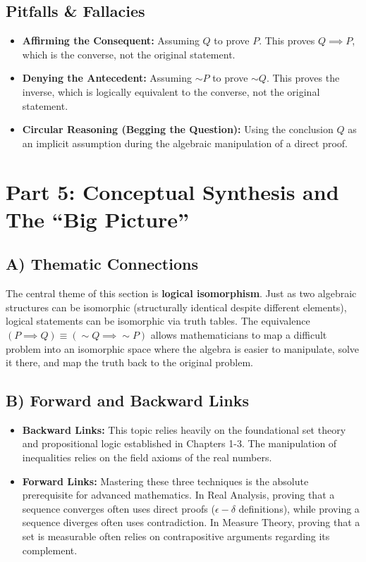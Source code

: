 \documentclass[11pt, a4paper]{article}
\theoremstyle{definition}
\theoremstyle{remark}
\begin{document}
\subsection{Pitfalls \& Fallacies}
\begin{itemize}
    \item \textbf{Affirming the Consequent:} Assuming $Q$ to prove $P$. This proves $Q \implies P$, which is the converse, not the original statement.
    \item \textbf{Denying the Antecedent:} Assuming $\sim P$ to prove $\sim Q$. This proves the inverse, which is logically equivalent to the converse, not the original statement.
    \item \textbf{Circular Reasoning (Begging the Question):} Using the conclusion $Q$ as an implicit assumption during the algebraic manipulation of a direct proof.
\end{itemize}

\section{Part 5: Conceptual Synthesis and The ``Big Picture''}

\subsection{A) Thematic Connections}
The central theme of this section is \textbf{logical isomorphism}. Just as two algebraic structures can be isomorphic (structurally identical despite different elements), logical statements can be isomorphic via truth tables. The equivalence $(P \implies Q) \equiv (\sim Q \implies \sim P)$ allows mathematicians to map a difficult problem into an isomorphic space where the algebra is easier to manipulate, solve it there, and map the truth back to the original problem.

\subsection{B) Forward and Backward Links}
\begin{itemize}
    \item \textbf{Backward Links:} This topic relies heavily on the foundational set theory and propositional logic established in Chapters 1-3. The manipulation of inequalities relies on the field axioms of the real numbers.
    \item \textbf{Forward Links:} Mastering these three techniques is the absolute prerequisite for advanced mathematics. In Real Analysis, proving that a sequence converges often uses direct proofs ($\epsilon-\delta$ definitions), while proving a sequence diverges often uses contradiction. In Measure Theory, proving that a set is measurable often relies on contrapositive arguments regarding its complement.
\end{itemize}
\end{document}

